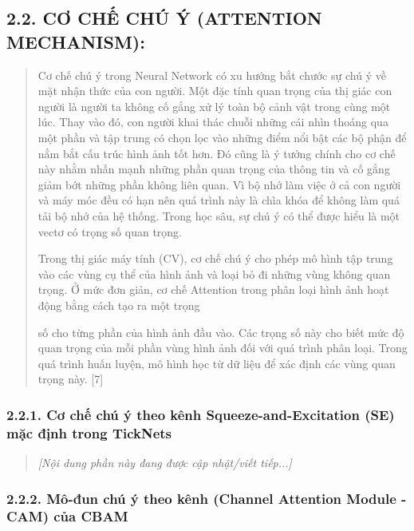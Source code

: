 \documentclass[
]{article}
\begin{document}
\subsection{2.2. CƠ CHẾ CHÚ Ý (ATTENTION MECHANISM):}\label{cux1a1-chux1ebf-chuxfa-uxfd-attention-mechanism}

\begin{quote}
Cơ chế chú ý trong Neural Network có xu hướng bắt chước sự chú ý về mặt
nhận thức của con người. Một đặc tính quan trọng của thị giác con người
là người ta không cố gắng xử lý toàn bộ cảnh vật trong cùng một lúc.
Thay vào đó, con người khai thác chuỗi những cái nhìn thoáng qua một
phần và tập trung có chọn lọc vào những điểm nổi bật các bộ phận để nắm
bắt cấu trúc hình ảnh tốt hơn. Đó cũng là ý tưởng chính cho cơ chế này
nhằm nhấn mạnh những phần quan trọng của thông tin và cố gắng giảm bớt
những phần không liên quan. Vì bộ nhớ làm việc ở cả con người và máy móc
đều có hạn nên quá trình này là chìa khóa để không làm quá tải bộ nhớ
của hệ thống. Trong học sâu, sự chú ý có thể được hiểu là một vectơ có
trọng số quan trọng.

Trong thị giác máy tính (CV), cơ chế chú ý cho phép mô hình tập trung
vào các vùng cụ thể của hình ảnh và loại bỏ đi những vùng không quan
trọng. Ở mức đơn giản, cơ chế Attention trong phân loại hình ảnh hoạt
động bằng cách tạo ra một trọng

số cho từng phần của hình ảnh đầu vào. Các trọng số này cho biết mức độ
quan trọng của mỗi phần vùng hình ảnh đối với quá trình phân loại. Trong
quá trình huấn luyện, mô hình học từ dữ liệu để xác định các vùng quan
trọng này. {[}7{]}
\end{quote}

\subsubsection{2.2.1. Cơ chế chú ý theo kênh Squeeze-and-Excitation (SE) mặc định trong TickNets}\label{2-2-1-se-attention}
\begin{quote}
\emph{[Nội dung phần này đang được cập nhật/viết tiếp...]}
\end{quote}

\subsubsection{2.2.2. Mô-đun chú ý theo kênh (Channel Attention Module - CAM) của CBAM}\label{channel-attention-module-cam}
\end{document}
